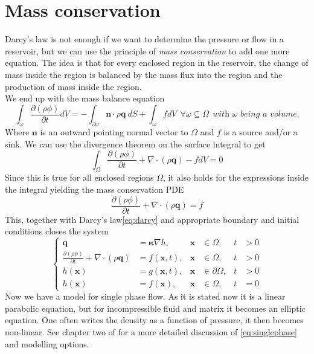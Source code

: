 \documentclass[../Main/main.tex]{subfiles}
\begin{document}
\section*{Mass conservation}
Darcy's law is not enough if we want to determine the pressure or flow in a reservoir, but we can use the principle of \emph{mass conservation} to add one more equation. 
The idea is that for every enclosed region in the reservoir, the change of mass inside the region is balanced by the mass flux into the region and the production of mass inside the region.
\\
We end up with the mass balance equation
\begin{equation*}
\int_{\omega}\frac{\partial (\rho \phi) }{\partial t} dV= -\int_{\partial\omega}\bm{n}\cdot\rho\bm{q} \ dS+\int_{\omega} f dV \ \ \forall \omega \subseteq \Omega \ \ \textit{with }\omega \textit{ being a volume.}
\end{equation*}
Where $\bm{n}$ is an outward pointing normal vector to $\Omega$ and $f$ is a source and/or a sink. We can use the divergence theorem on the surface integral to get
\begin{equation*}
\int_{\Omega}\frac{\partial (\rho \phi) }{\partial t} + \nabla \cdot(\rho \bm{q}) -fdV= 0
\end{equation*}
Since this is true for all enclosed regions $\Omega$, it also holds for the expressions inside the integral yielding the mass conservation PDE
\begin{equation*}
\frac{\partial (\rho \phi) }{\partial t} + \nabla \cdot (\rho \bm{q}) = f
\end{equation*}
This, together with Darcy's law\eqref{eq:darcy} and appropriate boundary and initial conditions closes the system
\begin{equation}\label{eq:singlephase}
\left \{ \begin{aligned}
	\bm{q} &=\bm{\kappa} \nabla h, & \bm{x} &\in \Omega,  &t &>0 \\
	\frac{\partial (\rho \phi) }{\partial t} + \nabla \cdot(\rho \bm{q}) &=f(\bm{x},t), & \bm{x} &\in \Omega, & t &>0 \\
	h(\bm{x}) &= g(\bm{x},t), &\bm{x} &\in \partial \Omega,&t &>0 \\
	h(\bm{x}) &= f(\bm{x}), & 	\bm{x} &\in \Omega,  &	t &=0 
\end{aligned}\right. 
\end{equation}
Now we have a model for single phase flow. As it is stated now it is a linear parabolic equation, but for incompressible fluid and matrix it becomes an elliptic equation. One often writes the density as a function of pressure, it then becomes non-linear. See chapter two of \cite{Nordbotten} for a more detailed discussion of \eqref{eq:singlephase} and modelling options.
\end{document}
